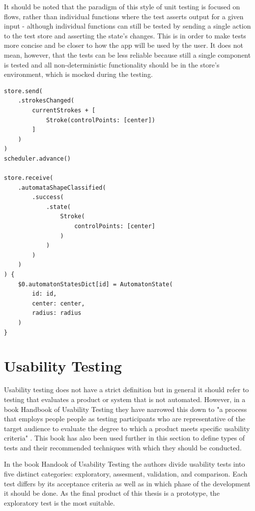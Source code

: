 It should be noted that the paradigm of this style of unit testing is focused on flows, rather than individual functions where the test asserts output for a given input - although individual functions can still be tested by sending a single action to the test store and asserting the state's changes. This is in order to make tests more concise and be closer to how the app will be used by the user. It does not mean, however, that the tests can be less reliable because still a single component is tested and all non-deterministic functionality should be in the store's environment, which is mocked during the testing. 

\begin{lstlisting}[caption={Testing creation of state}, label=test-state]
store.send(
    .strokesChanged(
        currentStrokes + [
            Stroke(controlPoints: [center])
        ]
    )
)
scheduler.advance()

store.receive(
    .automataShapeClassified(
        .success(
            .state(
                Stroke(
                    controlPoints: [center]
                )
            )
        )
    )
) {
    $0.automatonStatesDict[id] = AutomatonState(
        id: id,
        center: center,
        radius: radius
    )
}
\end{lstlisting}

\section{Usability Testing}

Usability testing does not have a strict definition but in general it should refer to testing that evaluates a product or system that is not automated. However, in a book Handbook of Usability Testing they have narrowed this down to "a process that employs people people as testing participants who are representative of the target audience to evaluate the degree to which a product meets specific usability criteria" \cite{handbook-usability-testing}. This book has also been used further in this section to define types of tests and their recommended techniques with which they should be conducted.

In the book Handook of Usability Testing the authors divide usability tests into five distinct categories: exploratory, assesment, validation, and comparison. Each test differs by its acceptance criteria as well as in which phase of the development it should be done. As the final product of this thesis is a prototype, the exploratory test is the most suitable.

